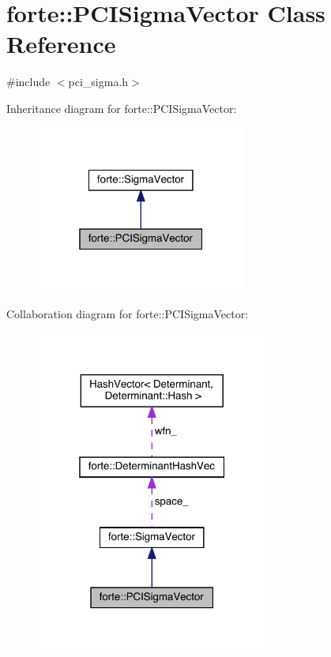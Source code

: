 \hypertarget{classforte_1_1_p_c_i_sigma_vector}{}\section{forte\+:\+:P\+C\+I\+Sigma\+Vector Class Reference}
\label{classforte_1_1_p_c_i_sigma_vector}


{\ttfamily \#include $<$pci\+\_\+sigma.\+h$>$}



Inheritance diagram for forte\+:\+:P\+C\+I\+Sigma\+Vector\+:
\nopagebreak
\begin{figure}[H]
\begin{center}
\leavevmode
\includegraphics[width=196pt]{classforte_1_1_p_c_i_sigma_vector__inherit__graph}
\end{center}
\end{figure}


Collaboration diagram for forte\+:\+:P\+C\+I\+Sigma\+Vector\+:
\nopagebreak
\begin{figure}[H]
\begin{center}
\leavevmode
\includegraphics[width=217pt]{classforte_1_1_p_c_i_sigma_vector__coll__graph}
\end{center}
\end{figure}
